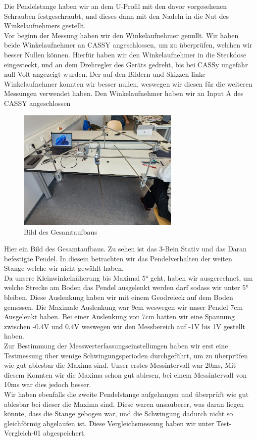 \documentclass[twoside]{protokoll}
\begin{document}
Die Pendelstange haben wir an dem U-Profil mit den davor vorgesehenen Schrauben festgeschraubt, und dieses dann mit den Nadeln in die Nut des Winkelaufnehmers gestellt.\\
Vor beginn der Messung haben wir den Winkelaufnehmer genullt. 
Wir haben beide Winkelaufnehmer an CASSY angeschlossen, um zu überprüfen, welchen wir besser Nullen können.
Hierfür haben wir den Winkelaufnehmer in die Steckdose eingesteckt, und an dem Drehregler des Geräts gedreht, bis bei CASSy ungefähr null Volt angezeigt wurden.
Der auf den Bildern und Skizzen linke Winkelaufnehmer konnten wir besser nullen, weswegen wir diesen für die weiteren Messungen verwendet haben.
Den Winkelaufnehmer haben wir an Input A des CASSY angeschlossen\\
\begin{figure}[H]
    \centering
    \includegraphics[width=0.7\textwidth]{Bilder/gesamtaufbau.pdf}
    \caption{Bild des Gesamtaufbaus}
    \end{figure}
Hier ein Bild des Gesamtaufbaus. Zu sehen ist das 3-Bein Stativ und das Daran befestigte Pendel.
In diesem betrachten wir das Pendelverhalten der weiten Stange welche wir nicht gewählt haben.\\

Da unsere Kleinwinkelnäherung bis Maximal 5° geht, haben wir ausgerechnet, um welche Strecke am Boden das Pendel ausgelenkt werden darf sodass wir unter 5° bleiben. 
Diese Auslenkung haben wir mit einem Geodreieck auf dem Boden gemessen. 
Die Maximale Auslenkung war 9cm weswegen wir unser Pendel 7cm Ausgelenkt haben.
Bei einer Auslenkung von 7cm hatten wir eine Spannung zwischen -0.4V und 0.4V weswegen wir den Messbereich auf -1V bis 1V gestellt haben.\\

Zur Bestimmung der Messwerterfassungseinstellungen haben wir erst eine Testmessung über wenige Schwingungsperioden durchgeführt, um zu überprüfen wie gut ablesbar die Maxima sind.
Unser erstes Messintervall war 20ms, Mit diesem Konnten wir die Maxima schon gut ablesen, bei einem Messintervall von 10ms war dies jedoch besser.\\
Wir haben ebenfalls die zweite Pendelstange aufgehangen und überprüft wie gut ablesbar bei dieser die Maxima sind.
 Diese waren unsauberer, was daran liegen könnte, dass die Stange gebogen war, und die Schwingung dadurch nicht so gleichförmig abgelaufen ist.
 Diese Vergleichsmessung haben wir unter Test-Vergleich-01 abgespeichert. \\
\end{document}
